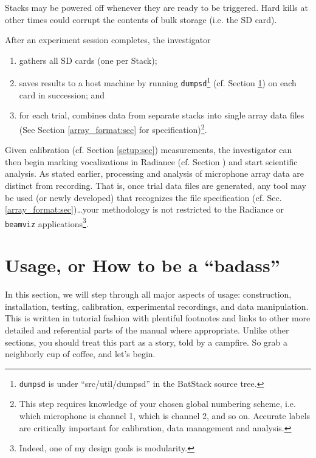 \documentclass[letterpaper]{article}
\begin{document}
Stacks may be powered off whenever they are ready to be
triggered. Hard kills at other times could corrupt the contents of
bulk storage (i.e. the SD card).

After an experiment session completes, the investigator
\begin{enumerate}
\item gathers all SD cards (one per Stack);

\item saves results to a host machine by running
  \texttt{dumpsd}\footnote{\texttt{dumpsd} is under
    ``src/util/dumpsd'' in the BatStack source tree.} (cf. Section
  \ref{usage:sec}) on each card in succession; and

\item for each trial, combines data from separate stacks into single
  array data files (See Section \ref{array_format:sec} for
  specification)\footnote{This step requires knowledge of your chosen
    global numbering scheme, i.e. which microphone is channel 1, which
    is channel 2, and so on. Accurate labels are critically important
    for calibration, data management and analysis.}.
\end{enumerate}
Given calibration (cf. Section \ref{setup:sec}) measurements, the
investigator can then begin marking vocalizations in Radiance
(cf. Section \label{radiance:sec}) and start scientific analysis. As
stated earlier, processing and analysis of microphone array data are
distinct from recording. That is, once trial data files are generated,
any tool may be used (or newly developed) that recognizes the file
specification (cf. Sec. \ref{array_format:sec})\ldots your methodology
is not restricted to the Radiance or \texttt{beamviz}
applications\footnote{Indeed, one of my design goals is modularity.}.

\section{Usage, or How to be a ``badass''}
\label{usage:sec}

In this section, we will step through all major aspects of usage:
construction, installation, testing, calibration, experimental
recordings, and data manipulation. This is written in tutorial fashion
with plentiful footnotes and links to other more detailed and
referential parts of the manual where appropriate. Unlike other
sections, you should treat this part as a story, told by a
campfire. So grab a neighborly cup of coffee, and let's begin.
\end{document}
